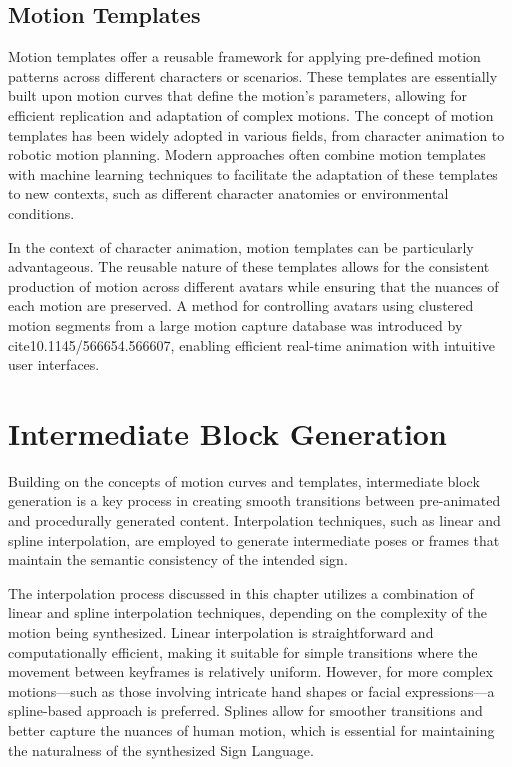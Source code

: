 \documentclass[../../main.tex]{subfiles}
\begin{document}
\subsection{Motion Templates}
\label{subsec:motion_templates}

Motion templates offer a reusable framework for applying pre-defined motion patterns across different characters or scenarios. These templates are essentially built upon motion curves that define the motion's parameters, allowing for efficient replication and adaptation of complex motions. The concept of motion templates has been widely adopted in various fields, from character animation to robotic motion planning. Modern approaches often combine motion templates with machine learning techniques to facilitate the adaptation of these templates to new contexts, such as different character anatomies or environmental conditions.

In the context of character animation, motion templates can be particularly advantageous. The reusable nature of these templates allows for the consistent production of motion across different avatars while ensuring that the nuances of each motion are preserved. A method for controlling avatars using clustered motion segments from a large motion capture database was introduced by cite{10.1145/566654.566607}, enabling efficient real-time animation with intuitive user interfaces.

\section{Intermediate Block Generation}
\label{sec:intermediate_block_generation}

Building on the concepts of motion curves and templates, intermediate block generation is a key process in creating smooth transitions between pre-animated and procedurally generated content. Interpolation techniques, such as linear and spline interpolation, are employed to generate intermediate poses or frames that maintain the semantic consistency of the intended sign.

The interpolation process discussed in this chapter utilizes a combination of linear and spline interpolation techniques, depending on the complexity of the motion being synthesized. Linear interpolation is straightforward and computationally efficient, making it suitable for simple transitions where the movement between keyframes is relatively uniform. However, for more complex motions—such as those involving intricate hand shapes or facial expressions—a spline-based approach is preferred. Splines allow for smoother transitions and better capture the nuances of human motion, which is essential for maintaining the naturalness of the synthesized Sign Language.
\end{document}
